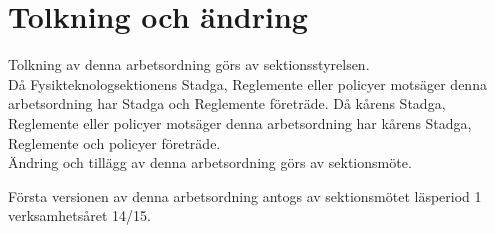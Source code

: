 \section{Tolkning och ändring}
Tolkning av denna arbetsordning görs av sektionsstyrelsen.\\ Då Fysikteknologsektionens Stadga, Reglemente eller policyer motsäger denna arbetsordning har Stadga och Reglemente företräde. Då kårens Stadga, Reglemente eller policyer motsäger denna arbetsordning har kårens Stadga, Reglemente och policyer företräde.\\
Ändring och tillägg av denna arbetsordning görs av sektionsmöte.


Första versionen av denna arbetsordning antogs av sektionsmötet läsperiod 1 verksamhetsåret 14/15.

\newpage
